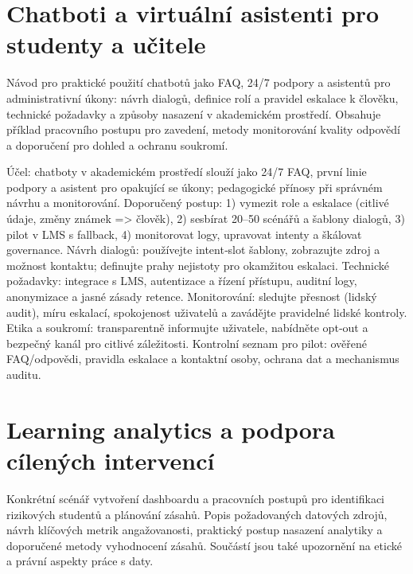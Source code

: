 \documentclass{report}%
\begin{document}
%
\section{Chatboti a virtuální asistenti pro studenty a učitele}%
Návod pro praktické použití chatbotů jako FAQ, 24/7 podpory a asistentů pro administrativní úkony: návrh dialogů, definice rolí a pravidel eskalace k člověku, technické požadavky a způsoby nasazení v akademickém prostředí. Obsahuje příklad pracovního postupu pro zavedení, metody monitorování kvality odpovědí a doporučení pro dohled a ochranu soukromí.%


%
\begin{flushleft}
Účel: chatboty v akademickém prostředí slouží jako 24/7 FAQ, první linie podpory a asistent pro opakující se úkony; pedagogické přínosy při správném návrhu a monitorování.
Doporučený postup: 1) vymezit role a eskalace (citlivé údaje, změny známek => člověk), 2) sesbírat 20–50 scénářů a šablony dialogů, 3) pilot v LMS s fallback, 4) monitorovat logy, upravovat intenty a škálovat governance.
Návrh dialogů: používejte intent‑slot šablony, zobrazujte zdroj a možnost kontaktu; definujte prahy nejistoty pro okamžitou eskalaci.
Technické požadavky: integrace s LMS, autentizace a řízení přístupu, auditní logy, anonymizace a jasné zásady retence.
Monitorování: sledujte přesnost (lidský audit), míru eskalací, spokojenost uživatelů a zavádějte pravidelné lidské kontroly.
Etika a soukromí: transparentně informujte uživatele, nabídněte opt‑out a bezpečný kanál pro citlivé záležitosti.
Kontrolní seznam pro pilot: ověřené FAQ/odpovědi, pravidla eskalace a kontaktní osoby, ochrana dat a mechanismus auditu.
\end{flushleft}%

%
\section{Learning analytics a podpora cílených intervencí}%
Konkrétní scénář vytvoření dashboardu a pracovních postupů pro identifikaci rizikových studentů a plánování zásahů. Popis požadovaných datových zdrojů, návrh klíčových metrik angažovanosti, praktický postup nasazení analytiky a doporučené metody vyhodnocení zásahů. Součástí jsou také upozornění na etické a právní aspekty práce s daty.%
\end{document}
